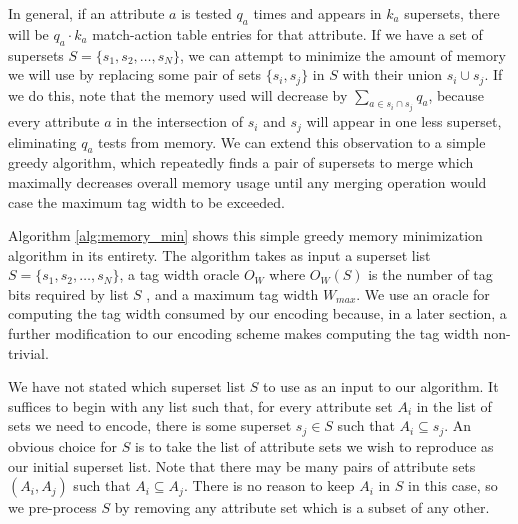 In general, if an attribute $a$ is tested $q_a$ times and appears in $k_a$ supersets, there will be $q_a\cdot k_a$ match-action table entries for that attribute. If we have a set of supersets $S = \{s_1, s_2, \dots, s_N\}$, we can attempt to minimize the amount of memory we will use by replacing some pair of sets $\{s_i, s_j\}$ in $S$ with their union $s_i\cup s_j$. If we do this, note that the memory used will decrease by $\sum_{a \in s_i\cap s_j}q_a$, because every attribute $a$ in the intersection of $s_i$ and $s_j$ will appear in one less superset, eliminating $q_a$ tests from memory. We can extend this observation to a simple greedy algorithm, which repeatedly finds a pair of supersets to merge which maximally decreases overall memory usage until any merging operation would case the maximum tag width to be exceeded. 


Algorithm \ref{alg:memory_min} shows this simple greedy memory minimization algorithm in its entirety. The algorithm takes as input a superset list $S = \{s_1, s_2, \dots, s_N\}$, a tag width oracle $O_W$ where $O_W(S)$ is the number of tag bits required by list $S$ , and a maximum tag width $W_{max}$. We use an oracle for computing the tag width consumed by our encoding because, in a later section, a further modification to our encoding scheme makes computing the tag width non-trivial. 

We have not stated which superset list $S$ to use as an input to our algorithm. It suffices to begin with any list such that, for every attribute set $A_i$ in the list of sets we need to encode, there is some superset $s_j \in S$ such that $A_i \subseteq s_j$. An obvious choice for $S$ is to take the list of attribute sets we wish to reproduce as our initial superset list. Note that there may be many pairs of attribute sets $(A_i, A_j)$ such that $A_i \subseteq A_j$. There is no reason to keep $A_i$ in $S$ in this case, so we pre-process $S$ by removing any attribute set which is a subset of any other. 


